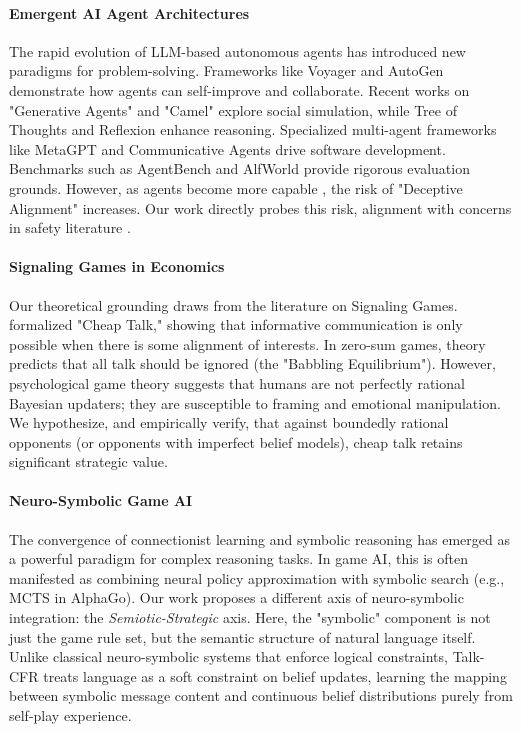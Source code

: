 \documentclass{article}
\begin{document}
\paragraph{Emergent AI Agent Architectures}
The rapid evolution of LLM-based autonomous agents \citep{xi2023rise, wang2023survey, mialon2023augmented} has introduced new paradigms for problem-solving. Frameworks like Voyager \citep{wang2023voyager} and AutoGen \citep{wu2023autogen} demonstrate how agents can self-improve and collaborate. Recent works on "Generative Agents" \citep{park2023generative} and "Camel" \citep{li2023camel} explore social simulation, while Tree of Thoughts \citep{yao2024tree} and Reflexion \citep{shinn2023reflexion} enhance reasoning. Specialized multi-agent frameworks like MetaGPT \citep{hong2023metagpt} and Communicative Agents \citep{qian2023communicative} drive software development. Benchmarks such as AgentBench \citep{liu2023agentbench} and AlfWorld \citep{shridhar2020alfworld} provide rigorous evaluation grounds. However, as agents become more capable \citep{openai2023gpt4, team2023gemini, touvron2023llama}, the risk of "Deceptive Alignment" \citep{hubinger2019risks, sharma2023understanding} increases. Our work directly probes this risk, alignment with concerns in safety literature \citep{kenton2021alignment, anthropic2022constitutional}.

\paragraph{Signaling Games in Economics}
Our theoretical grounding draws from the literature on Signaling Games. \citet{crawford1982strategic} formalized "Cheap Talk," showing that informative communication is only possible when there is some alignment of interests. In zero-sum games, theory predicts that all talk should be ignored (the "Babbling Equilibrium"). However, psychological game theory suggests that humans are not perfectly rational Bayesian updaters; they are susceptible to framing and emotional manipulation. We hypothesize, and empirically verify, that against boundedly rational opponents (or opponents with imperfect belief models), cheap talk retains significant strategic value.

\paragraph{Neuro-Symbolic Game AI}
The convergence of connectionist learning and symbolic reasoning has emerged as a powerful paradigm for complex reasoning tasks. In game AI, this is often manifested as combining neural policy approximation with symbolic search (e.g., MCTS in AlphaGo). Our work proposes a different axis of neuro-symbolic integration: the \textit{Semiotic-Strategic} axis. Here, the "symbolic" component is not just the game rule set, but the semantic structure of natural language itself. Unlike classical neuro-symbolic systems that enforce logical constraints, Talk-CFR treats language as a soft constraint on belief updates, learning the mapping between symbolic message content and continuous belief distributions purely from self-play experience.
\end{document}
